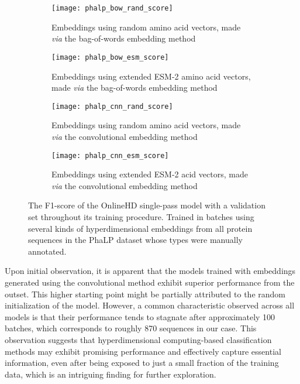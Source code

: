 \begin{figure}[h!]
    \centering
    \begin{subfigure}{0.48\textwidth}
        \texttt{[image: phalp\_bow\_rand\_score]}
        \caption{Embeddings using random amino acid vectors, made \textit{via} the bag-of-words embedding method}
        \label{fig:subfig-a3}
    \end{subfigure}
    \hfill
    \begin{subfigure}{0.48\textwidth}
        \texttt{[image: phalp\_bow\_esm\_score]}
        \caption{Embeddings using extended ESM-2 amino acid vectors, made \textit{via} the bag-of-words embedding method}
        \label{fig:subfig-b3}
    \end{subfigure}
    
    \begin{subfigure}{0.48\textwidth}
        \texttt{[image: phalp\_cnn\_rand\_score]}
        \caption{Embeddings using random amino acid vectors, made \textit{via} the convolutional embedding method}
        \label{fig:subfig-c3}
    \end{subfigure}
    \hfill
    \begin{subfigure}{0.48\textwidth}
        \texttt{[image: phalp\_cnn\_esm\_score]}
        \caption{Embeddings using extended ESM-2 acid vectors, made \textit{via} the convolutional embedding method}
        \label{fig:subfig-d3}
    \end{subfigure}
    \caption{The F1-score of the OnlineHD single-pass model with a validation set throughout its training procedure. Trained in batches using several kinds of hyperdimensional embeddings from all protein sequences in the PhaLP dataset whose types were manually annotated.}
    \label{fig:main3}
\end{figure}

Upon initial observation, it is apparent that the models trained with embeddings generated using the convolutional method exhibit superior performance from the outset. This higher starting point might be partially attributed to the random initialization of the model. However, a common characteristic observed across all models is that their performance tends to stagnate after approximately 100 batches, which corresponds to roughly 870 sequences in our case. This observation suggests that hyperdimensional computing-based classification methods may exhibit promising performance and effectively capture essential information, even after being exposed to just a small fraction of the training data, which is an intriguing finding for further exploration.
